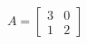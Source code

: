 \documentclass[preview]{standalone}
\begin{document}
\begin{align*}
A = \begin{bmatrix} 3 & 0 \\ 1& 2 \end{bmatrix}
\end{align*}
\end{document}
